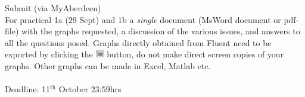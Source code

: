 \documentclass[11pt,a4paper,oneside,hidelinks]{scrartcl}
\begin{document}
\vspace{2cm}
Submit (via MyAberdeen)\\
For practical 1a (29 Sept) and 1b a \emph{single} document (MsWord document or pdf-file) with the graphs requested, a discussion of the various issues, and answers to all the questions posed. Graphs directly obtained from Fluent need to be exported by clicking the \includegraphics[width=.4cm]{export_fig_icon.png} button, do not make direct screen copies of your graphs. Other graphs can be made in Excel, Matlab etc.
\\
\\
Deadline: 11$^\mathrm{th}$ October 23:59hrs
\end{document}
